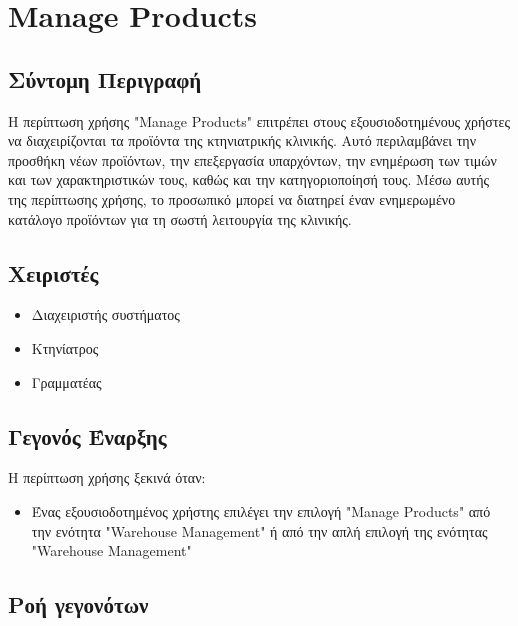 \documentclass[12pt,a4paper,twoside]{book}
\begin{document}
\section{Manage Products}

\subsection{Σύντομη Περιγραφή}
Η περίπτωση χρήσης "Manage Products" επιτρέπει στους εξουσιοδοτημένους χρήστες να διαχειρίζονται τα προϊόντα της κτηνιατρικής κλινικής. Αυτό περιλαμβάνει την προσθήκη νέων προϊόντων, την επεξεργασία υπαρχόντων, την ενημέρωση των τιμών και των χαρακτηριστικών τους, καθώς και την κατηγοριοποίησή τους. Μέσω αυτής της περίπτωσης χρήσης, το προσωπικό μπορεί να διατηρεί έναν ενημερωμένο κατάλογο προϊόντων για τη σωστή λειτουργία της κλινικής. %

\subsection{Χειριστές}
\begin{itemize}
  \item Διαχειριστής συστήματος
  \item Κτηνίατρος
  \item Γραμματέας
\end{itemize}

\subsection{Γεγονός Έναρξης}
Η περίπτωση χρήσης ξεκινά όταν:
\begin{itemize}
  \item Ένας εξουσιοδοτημένος χρήστης επιλέγει την επιλογή "Manage Products" από την ενότητα "Warehouse Management" ή από την απλή επιλογή της ενότητας "Warehouse Management" %
\end{itemize}

\subsection{Ροή γεγονότων}
\end{document}
